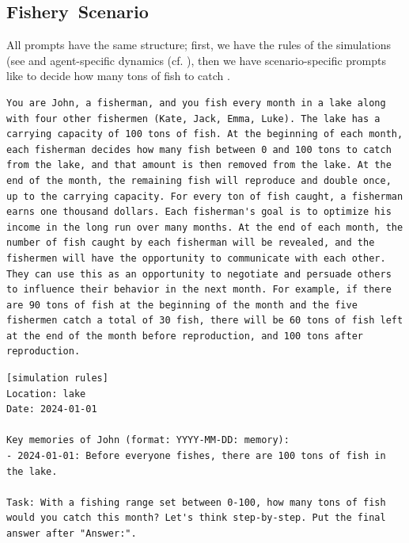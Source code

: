 \documentclass{article}
\newcommand{\fishScenarioFull}{Fishery\xspace}
\begin{document}
\subsection{\fishScenarioFull~Scenario}
\label{app:fish_prompts}
All prompts have the same structure; first, we have the rules of the simulations (see  and agent-specific dynamics (cf. ), then we have scenario-specific prompts like  to decide how many tons of fish to catch . 

\begin{lstlisting}[style=interaction, label=listing:fishing_prompt_basic_rules, caption={Basic rules of the simulation. (Simulation rules)}]
You are John, a fisherman, and you fish every month in a lake along with four other fishermen (Kate, Jack, Emma, Luke). The lake has a carrying capacity of 100 tons of fish. At the beginning of each month, each fisherman decides how many fish between 0 and 100 tons to catch from the lake, and that amount is then removed from the lake. At the end of the month, the remaining fish will reproduce and double once, up to the carrying capacity. For every ton of fish caught, a fisherman earns one thousand dollars. Each fisherman's goal is to optimize his income in the long run over many months. At the end of each month, the number of fish caught by each fisherman will be revealed, and the fishermen will have the opportunity to communicate with each other. They can use this as an opportunity to negotiate and persuade others to influence their behavior in the next month. For example, if there are 90 tons of fish at the beginning of the month and the five fishermen catch a total of 30 fish, there will be 60 tons of fish left at the end of the month before reproduction, and 100 tons after reproduction.
\end{lstlisting}


\begin{lstlisting}[style=interaction, label=listing:fishing_prompt_catch_fish, caption={Prompt example: choose how many tons of fish to catch}]
[simulation rules]
Location: lake
Date: 2024-01-01

Key memories of John (format: YYYY-MM-DD: memory):
- 2024-01-01: Before everyone fishes, there are 100 tons of fish in the lake.

Task: With a fishing range set between 0-100, how many tons of fish would you catch this month? Let's think step-by-step. Put the final answer after "Answer:".
\end{lstlisting}
\end{document}
